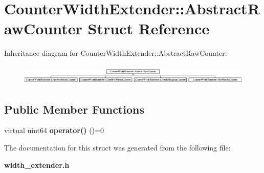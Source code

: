 \section{Counter\+Width\+Extender\+:\+:Abstract\+Raw\+Counter Struct Reference}
\label{structCounterWidthExtender_1_1AbstractRawCounter}
Inheritance diagram for Counter\+Width\+Extender\+:\+:Abstract\+Raw\+Counter\+:\begin{figure}[H]
\begin{center}
\leavevmode
\includegraphics[height=0.968858cm]{structCounterWidthExtender_1_1AbstractRawCounter}
\end{center}
\end{figure}
\subsection*{Public Member Functions}
\begin{DoxyCompactItemize}
\item 
virtual uint64 {\bfseries operator()} ()=0\label{structCounterWidthExtender_1_1AbstractRawCounter_a608ae097b3e1fd42768f3cd408fa123d}

\end{DoxyCompactItemize}


The documentation for this struct was generated from the following file\+:\begin{DoxyCompactItemize}
\item 
{\bf width\+\_\+extender.\+h}\end{DoxyCompactItemize}
